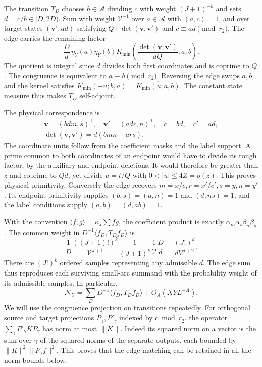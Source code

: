 \documentclass[11pt]{amsart}
\numberwithin{equation}{section}
\theoremstyle{remark}
\begin{document}
The transition $T_D$ chooses $b\in\mathcal A$ dividing $c$ with weight
$(J+1)^{-k}$ and sets $d=c/b\in[D,2D)$. Sum with weight $\mathcal V^{-1}$ over
$a\in\mathcal A$ with $(a,c)=1$, and over target states
$(\mathbf v',ad)$ satisfying $Q\mid\det(\mathbf v,\mathbf v')$ and
$c\equiv ad\pmod{r_2}$. The edge carries the remaining factor
\begin{equation}\label{eq:physicaledgeweight}
 \frac Dd\,\eta_Y(a)\eta_Y(b)
 K_{\mathrm{min}}\!\left(\frac{\det(\mathbf v,\mathbf v')}{dQ};a,b\right).
\end{equation}
The quotient is integral since $d$ divides both first coordinates
and is coprime to $Q$. The congruence is equivalent to
$a\equiv b\pmod{r_2}$. Reversing the edge swaps $a,b$, and the kernel
satisfies $K_{\mathrm{min}}(-u;b,a)=\overline{K_{\mathrm{min}}(u;a,b)}$.
The constant state measure thus makes $T_D$ self-adjoint.

The physical correspondence is
\begin{equation}\label{eq:physicalvectors}
 \begin{gathered}
 \mathbf v=(bdm,s)^{\mathsf T},\quad \mathbf v'=(adr,n)^{\mathsf T},
 \quad c=bd,\quad c'=ad,\\
 \det(\mathbf v,\mathbf v')=d(bmn-ars).
 \end{gathered}
\end{equation}
The coordinate units follow from the coefficient masks and the label
support. A prime common to both coordinates of an endpoint would have
to divide its rough factor, by the auxiliary and endpoint deletions.
It would therefore be greater than $z$ and coprime to $Qd$, yet divide
$u=t/Q$ with $0<|u|\le4Z=o(z)$. This proves physical primitivity.
Conversely the edge recovers $m=x/c,r=x'/c',s=y,n=y'$.
Its endpoint primitivity supplies $(b,s)=(a,n)=1$ and $(d,ns)=1$,
and the label conditions supply $(a,b)=(d,ab)=1$.

With the convention $\langle f,g\rangle=\kappa_J\sum\overline f g$,
the coefficient product is exactly
$\alpha_m\overline{\alpha_r}\beta_n\overline{\beta_s}$. The common
weight in $D^{-1}\langle f_D,T_Df_D\rangle$ is
\begin{equation}\label{eq:pairingweight}
 \frac1D\frac{((J+1)!)^k}{\mathcal V^{J+1}}\frac1{(J+1)^k}\frac1{\mathcal V}\frac Dd
   =\frac{(J!)^k}{dV^{J+2}}.
\end{equation}
There are $(J!)^k$ ordered samples representing any admissible $d$.
The edge sum thus reproduces each surviving small-arc summand with the
probability weight of its admissible samples. In particular,
\begin{equation}\label{eq:operatorpairing}
 \mathcal N_Y=\sum_D D^{-1}\langle f_D,T_Df_D\rangle+O_A(XYL^{-A}).
\end{equation}
We will use the congruence projection on transitions repeatedly. For
orthogonal source and target projections $P_\gamma,P'_\gamma$ indexed
by $c\bmod r_2$, the operator
$\sum_\gamma P'_\gamma K P_\gamma$ has norm at most $\|K\|$.
Indeed its squared norm on a vector is the sum over $\gamma$ of the
squared norms of the separate outputs, each bounded by
$\|K\|^2\|P_\gamma f\|^2$. This proves that the edge matching can be
retained in all the norm bounds below.
\end{document}

